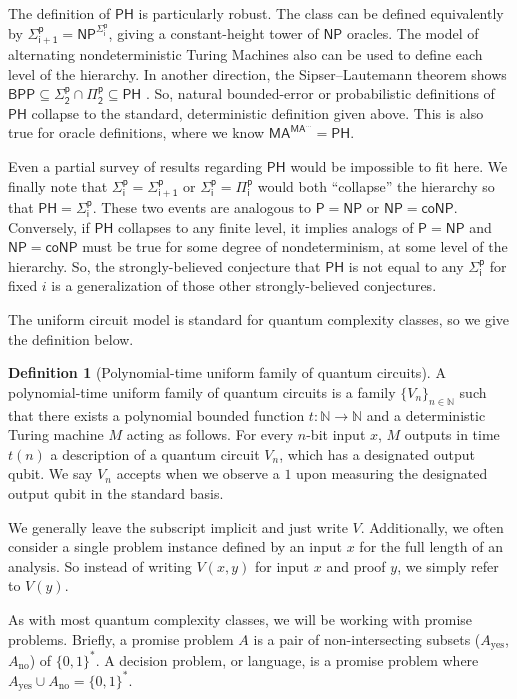 \documentclass[11pt]{article}
\theoremstyle{definition}
\newtheorem{definition}[theorem]{Definition}
\newcommand{\yes}{\text{yes}}
\newcommand{\no}{\text{no}}
\newcommand{\nats}{\mathbb N}
\newcommand{\N}{\nats}
\newcommand{\class}[1]{\ensuremath{\mathsf{#1}}\xspace}
\newcommand{\PTIME}{\class{P}}
\newcommand{\BPP}{\class{BPP}}
\newcommand{\NP}{\class{NP}}
\newcommand{\coNP}{\class{coNP}}
\newcommand{\MA}{\class{MA}}
\newcommand{\PH}{\class{PH}}
\newcommand{\Sigmai}[1][i]{\class{\Sigma^{p}_{#1}}}
\newcommand{\Pii}[1][i]{\class{\Pi^{p}_{#1}}}
\begin{document}
The definition of $\PH$ is particularly robust.
The class can be defined equivalently by $\Sigmai[i+1] = \NP^{\Sigmai[i]}$, giving a constant-height tower of $\NP$ oracles.
The model of alternating nondeterministic Turing Machines also can be used to define each level of the hierarchy.
In another direction, the Sipser–Lautemann theorem shows $\BPP \subseteq \Sigmai[2]\cap \Pii[2] \subseteq \PH$ \cite{sipser1983complexity,LAUTEMANN1983215}.
So, natural bounded-error or probabilistic definitions of $\PH$ collapse to the standard, deterministic definition given above. This is also true for oracle definitions, where we know $\MA^{\MA^{\ldots}} = \PH$.

Even a partial survey of results regarding $\PH$ would be impossible to fit here. We finally note that $\Sigmai[i]=\Sigmai[i+1]$ or $\Sigmai[i]=\Pii[i]$ would both ``collapse'' the hierarchy so that $\PH=\Sigmai[i]$. These two events are analogous to $\PTIME=\NP$ or $\NP=\coNP$. Conversely, if $\PH$ collapses to any finite level, it implies analogs of $\PTIME=\NP$ and $\NP=\coNP$ must be true for some degree of nondeterminism, at some level of the hierarchy. So, the strongly-believed conjecture that $\PH$ is not equal to any $\Sigmai[i]$ for fixed $i$ is a generalization of those other strongly-believed conjectures.

The uniform circuit model is standard for quantum complexity classes, so we give the definition below.

\begin{definition}[Polynomial-time uniform family of quantum circuits]
A polynomial-time uniform family of quantum circuits is a family $\{V_n\}_{n \in \N}$ such that there exists a polynomial bounded function $t: \N \to \N$ and a deterministic Turing machine $M$ acting as follows. 
For every $n$-bit input $x$, $M$ outputs in time $t(n)$ a description of a quantum circuit $V_n$, which has a designated output qubit. 
We say $V_n$ accepts when we observe a $1$ upon measuring the designated output qubit in the standard basis. 
\end{definition}

We generally leave the subscript implicit and just write $V$.
Additionally, we often consider a single problem instance defined by an input $x$ for the full length of an analysis.
So instead of writing $V(x,y)$ for input $x$ and proof $y$,
we simply refer to $V(y)$.

As with most quantum complexity classes, we will be working with promise problems. 
Briefly, a promise problem $A$ is a pair of non-intersecting subsets ($A_\yes$, $A_\no$) of $\{0,1\}^*$. A decision problem, or language, is a promise problem where $A_\yes\cup A_\no = \{0,1\}^*$.
\end{document}
